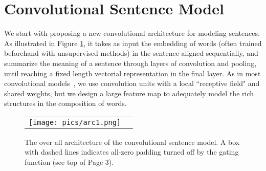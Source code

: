 \documentclass{article} \usepackage{nips14submit_e,times}
\newcommand{\0}{\ensuremath{\mathbf{0}}}
\newcommand{\1}{\ensuremath{\mathbf{1}}}
\begin{document}
\section{Convolutional Sentence Model} \label{s:senCNN} \vspace{-10pt}
We start with proposing a new convolutional architecture for modeling sentences. As illustrated in Figure \ref{f:senCNN}, it takes as input the embedding of words (often trained beforehand with unsupervised methods) in the sentence aligned sequentially, and summarize the meaning of a sentence through layers of convolution and pooling, until reaching a fixed length vectorial representation in the final layer. As in most convolutional models~\cite{cnn, cnn_speech}, we use convolution units with a local ``receptive field" and shared weights, but we design a large feature map to adequately model the rich structures in the composition of words. \vspace{-5pt}
\begin{figure}[h!]
\begin{center}
    \begin{tabular}[c]{cc}
      \texttt{[image: pics/arc1.png]} \vspace{-7pt}
\end{tabular}
    \caption{The over all architecture of the convolutional sentence model. A box with dashed lines indicates all-zero padding turned off by the gating function (see top of Page 3).}
    \label{f:senCNN}
  \end{center}
\end{figure} \vspace{-10pt}
\end{document}
